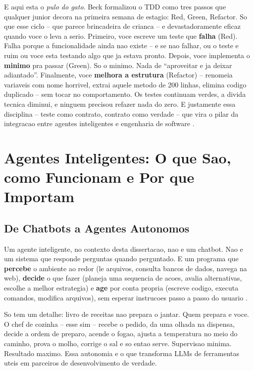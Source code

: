 \documentclass[12pt,a4paper,oneside,sumario=tradicional,chapter=TITLE,section=TITLE,subsection=TITLE,english,brazil]{abntex2}
\begin{document}
E aqui esta o \textit{pulo do gato}. Beck \cite{beck2003test} formalizou o TDD como tres passos que qualquer junior decora na primeira semana de estagio: Red, Green, Refactor. So que esse ciclo -- que parece brincadeira de crianca -- e devastadoramente eficaz quando voce o leva a serio. Primeiro, voce escreve um teste que \textbf{falha} (Red). Falha porque a funcionalidade ainda nao existe -- e se nao falhar, ou o teste e ruim ou voce esta testando algo que ja estava pronto. Depois, voce implementa o \textbf{minimo} pra passar (Green). So o minimo. Nada de ``aproveitar e ja deixar adiantado''. Finalmente, voce \textbf{melhora a estrutura} (Refactor) -- renomeia variaveis com nome horrivel, extrai aquele metodo de 200 linhas, elimina codigo duplicado -- sem tocar no comportamento. Os testes continuam verdes, a divida tecnica diminui, e ninguem precisou refazer nada do zero. E justamente essa disciplina -- teste como contrato, contrato como verdade -- que vira o pilar da integracao entre agentes inteligentes e engenharia de software \cite[Cap. 6]{macedo2026engenharia}.

\section{Agentes Inteligentes: O que Sao, como Funcionam e Por que Importam}

\subsection{De Chatbots a Agentes Autonomos}

Um agente inteligente, no contexto desta dissertacao, nao e um chatbot. Nao e um sistema que responde perguntas quando perguntado. E um programa que \textbf{percebe} o ambiente ao redor (le arquivos, consulta bancos de dados, navega na web), \textbf{decide} o que fazer (planeja uma sequencia de acoes, avalia alternativas, escolhe a melhor estrategia) e \textbf{age} por conta propria (escreve codigo, executa comandos, modifica arquivos), sem esperar instrucoes passo a passo do usuario \cite{macedo2026engenharia}.

So tem um detalhe: livro de receitas nao prepara o jantar. Quem prepara e voce. O chef de cozinha -- esse sim -- recebe o pedido, da uma olhada na dispensa, decide a ordem de preparo, acende o fogao, ajusta a temperatura no meio do caminho, prova o molho, corrige o sal e so entao serve. Supervisao minima. Resultado maximo. Essa autonomia e o que transforma LLMs de ferramentas uteis em parceiros de desenvolvimento de verdade.
\end{document}
